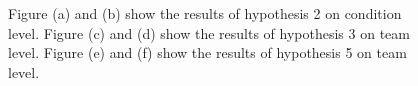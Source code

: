 \documentclass[sigchi]{acmart}
\begin{document}
\begin{figure}[H]
  \centering
  \qquad
  \qquad
  \qquad
  \qquad
  \qquad
  \qquad
  \caption[Results of hypothesis 2, 3 and 5]{Figure (a) and (b) show the results of hypothesis 2 on condition level. Figure (c) and (d) show the results of hypothesis 3 on team level. Figure (e) and (f) show the results of hypothesis 5 on team level.}
  \label{H2H3H5}
\end{figure}
\end{document}
